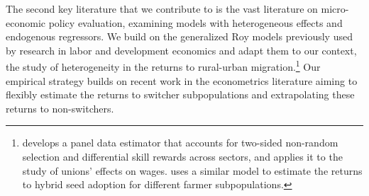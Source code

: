\documentclass[12pt]{article}
\begin{document}


The second key literature that we contribute to is the vast literature on micro-economic policy evaluation, examining models with heterogeneous effects and endogenous regressors.
We build on the generalized Roy models previously used by research in labor and development economics and adapt them to our context, the study of heterogeneity in the returns to rural-urban migration.\footnote{\cite{lemieuxEstimatingEffectsUnions1998} develops a panel data estimator that accounts for two-sided non-random selection and differential skill rewards across sectors, and applies it to the study of unions' effects on wages. \cite{suriSelectionComparativeAdvantage2011} uses a similar model to estimate the returns to hybrid seed adoption for different farmer subpopulations.}
Our empirical strategy builds on recent work in the econometrics literature \citep{verdierAverageTreatmentEffects2020a,tjernstromCommentSuri2011} aiming to flexibly estimate the returns to switcher subpopulations and extrapolating these returns to non-switchers.
\end{document}
